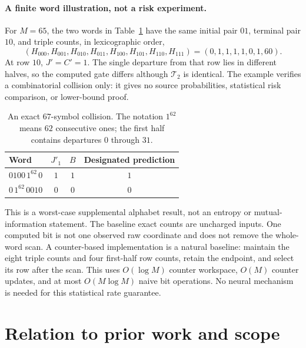 \documentclass[11pt,letterpaper]{article}
\newcommand{\cT}{\mathcal T}
\theoremstyle{definition}
\theoremstyle{remark}
\numberwithin{equation}{section}
\begin{document}
\paragraph{A finite word illustration, not a risk experiment.}
For $M=65$, the two words in Table~\ref{tab:words} have the same initial pair $01$, terminal pair $10$, and triple counts, in lexicographic order,
\[
 (H_{000},H_{001},H_{010},H_{011},H_{100},H_{101},H_{110},H_{111})
 =(0,1,1,1,1,0,1,60).
\]
At row $10$, $J'=C'=1$. The single departure from that row lies in different halves, so the computed gate differs although $\cT_2$ is identical. The example verifies a combinatorial collision only: it gives no source probabilities, statistical risk comparison, or lower-bound proof.
\begin{table}[ht]
\centering
\caption{An exact $67$-symbol collision. The notation $1^{62}$ means $62$ consecutive ones; the first half contains departures $0$ through $31$.}\label{tab:words}
\begin{tabular}{lccc}
\toprule
Word & $J'_1$ & $B$ & Designated prediction\\
\midrule
$0100\,1^{62}\,0$ & $1$ & $1$ & $1$\\
$0\,1^{62}\,0010$ & $0$ & $0$ & $0$\\
\bottomrule
\end{tabular}
\end{table}

This is a worst-case supplemental alphabet result, not an entropy or mutual-information statement. The baseline exact counts are uncharged inputs. One computed bit is not one observed raw coordinate and does not remove the whole-word scan. A counter-based implementation is a natural baseline: maintain the eight triple counts and four first-half row counts, retain the endpoint, and select its row after the scan. This uses $O(\log M)$ counter workspace, $O(M)$ counter updates, and at most $O(M\log M)$ naive bit operations. No neural mechanism is needed for this statistical rate guarantee.



\section{Relation to prior work and scope}\label{sec:related}
\end{document}

